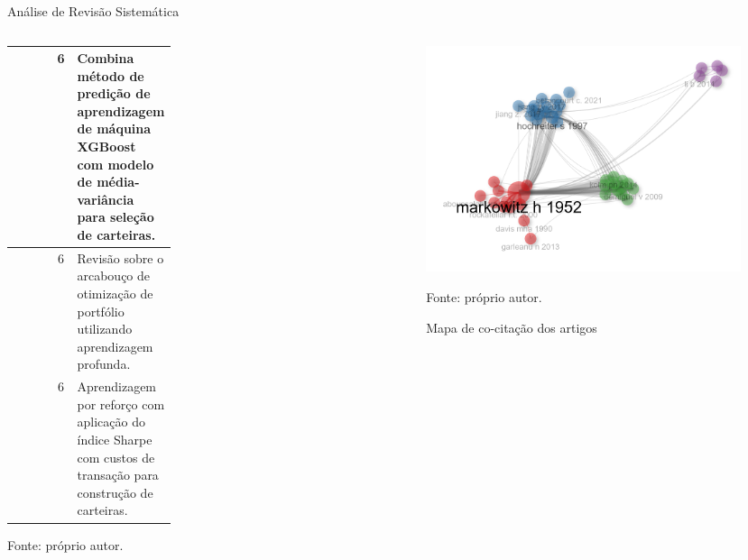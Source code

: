 \begin{frame}{Análise de Revisão Sistemática}
\begin{columns}
\begin{column}{0.65\textwidth}
\begin{quadro}[htbp]
{\begin{tabular}{p{0.45\linewidth}cp{\linewidth}}
                        \citeauthor{chen2021mean}\citeyear{chen2021mean} & 6 & Combina método de predição de aprendizagem de máquina XGBoost com modelo de média-variância para seleção de carteiras. \\ \hline
                        \citeauthor{heaton2017deep}\citeyear{heaton2017deep} & 6 & Revisão sobre o arcabouço de otimização de portfólio utilizando aprendizagem profunda. \\ \hline
                        \citeauthor{moody1998performance}\citeyear{moody1998performance} & 6 & Aprendizagem por reforço com aplicação do índice Sharpe com custos de transação para construção de carteiras. \\ \hline
                    \end{tabular}%
                    }
                    \par \footnotesize Fonte: próprio autor.
                \end{quadro}

            \end{column}
            \begin{column}{0.5\textwidth}

        
                \begin{figure}[htbp]
                    \centering
                    \caption{Mapa de co-citação dos artigos}
                    \label{fig:co_citacao}
                    \includegraphics[width=0.98\textwidth]{./images/cocitation_network.png}
                    \par \footnotesize Fonte: próprio autor.
                \end{figure}

            \end{column}
        \end{columns}
        


    \end{frame}





